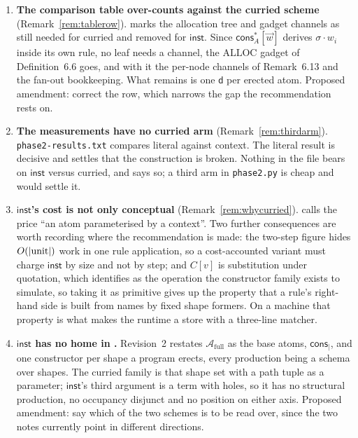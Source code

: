 \documentclass[11pt,a4paper]{article}
\newcommand{\code}[1]{\texttt{#1}}
\newcommand{\dd}{\mathsf{d}}
\newcommand{\cons}{\mathsf{cons}}
\newcommand{\Atm}{\mathcal{A}}
\newcommand{\ALLOC}{\mathrm{ALLOC}}
\newcommand{\inst}{\mathsf{inst}}
\theoremstyle{definition}
\theoremstyle{plain}
\begin{document}
\begin{enumerate}[leftmargin=1.8em]

\item \textbf{The comparison table over-counts against the curried scheme}
(Remark~\ref{rem:tablerow}). \cite[\S6.7]{draft3} marks the allocation tree
and gadget channels as still needed for curried and removed for $\inst$. Since
$\cons^{*}_{A}[\vec w]$ derives $\sigma\!\cdot\!w_{i}$ inside its own rule, no
leaf needs a channel, the $\ALLOC$ gadget of Definition~6.6 goes, and with it
the per-node channels of Remark~6.13 and the fan-out bookkeeping. What remains
is one $\dd$ per erected atom. Proposed amendment: correct the row, which
narrows the gap the recommendation rests on.

\item \textbf{The measurements have no curried arm}
(Remark~\ref{rem:thirdarm}). \code{phase2-results.txt} compares literal
against context. The literal result is decisive and settles that the
construction is broken. Nothing in the file bears on $\inst$ versus curried,
and \cite[Rem.~6.22]{draft3} says so; a third arm in \code{phase2.py} is cheap
and would settle it.

\item \textbf{$\inst$'s cost is not only conceptual}
(Remark~\ref{rem:whycurried}). \cite[Rem.~6.22]{draft3} calls the price ``an
atom parameterised by a context''. Two further consequences are worth
recording where the recommendation is made: the two-step figure hides
$O(|{\rm unit}|)$ work in one rule application, so a cost-accounted variant
must charge $\inst$ by size and not by step; and $C[v]$ is substitution under
quotation, which \cite[\S3.6]{draft3} identifies as the operation the
constructor family exists to simulate, so taking it as primitive gives up the
property that a rule's right-hand side is built from names by fixed shape
formers. On a machine that property is what makes the runtime a store with a
three-line matcher.

\item \textbf{$\inst$ has no home in \cite{logic}.} Revision~2 restates
$\Atm_{\mathrm{full}}$ as the base atoms, $\cons_{\mid}$, and one constructor
per shape a program erects, every production being a schema over shapes. The
curried family is that shape set with a path tuple as a parameter; $\inst$'s
third argument is a term with holes, so it has no structural production, no
occupancy disjunct and no position on either axis. Proposed amendment: say
which of the two schemes \cite{logic} is to be read over, since the two notes
currently point in different directions.


\end{enumerate}
\end{document}
